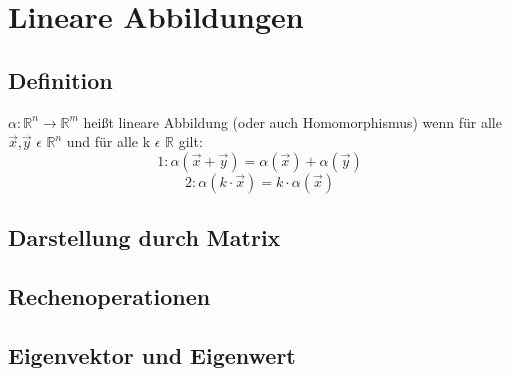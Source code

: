 \documentclass[a4paper,10pt]{scrartcl}
\begin{document}
    \section{Lineare Abbildungen}
        \subsection{Definition}
            $\alpha: \mathbb{R}^n \rightarrow \mathbb{R}^m$ heißt lineare Abbildung (oder auch Homomorphismus) wenn für alle \\$\vec{x}$,$\vec{y}$ $\epsilon$ $\mathbb{R}^n$ und
            für alle k $\epsilon$ $\mathbb{R}$ gilt:
            \[1: \alpha(\vec{x} + \vec{y}) = \alpha(\vec{x}) + \alpha(\vec{y})\]
            \[2: \alpha(k \cdot \vec{x}) = k \cdot \alpha(\vec{x})\]
        \subsection{Darstellung durch Matrix}
        \subsection{Rechenoperationen}
        \subsection{Eigenvektor und Eigenwert}
    
\end{document}
